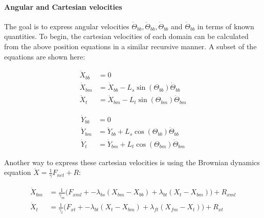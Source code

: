 \documentclass[10pt]{article} %
\begin{document}
\paragraph{Angular and Cartesian velocities}
The goal is to express angular velocities $\dot{\Theta}_{bb}, \dot{\Theta}_{bb}, \dot{\Theta}_{bb}$ and $\dot{\Theta}_{bb}$ in terms of known quantities. To begin, the cartesian velocities of each domain can be calculated from the above position equations in a similar recursive manner. A subset of the equations are shown here:

\noindent\begin{minipage}{0.49\linewidth}
\begin{align}
  \dot{X}_{bb} &= 0 \\
  \dot{X}_{bm} &= \dot{X}_{bb} - L_{s}\sin(\Theta_{bb})\dot{\Theta}_{bb} \label{cartesian-bmx}\\
  \dot{X}_{t } &= \dot{X}_{bm} - L_{t}\sin(\Theta_{bm})\dot{\Theta}_{bm}
\end{align}
\end{minipage}
\begin{minipage}{0.49\linewidth}
\begin{align}                                                                          
  \dot{Y}_{bb} &= 0 \\                                                        
  \dot{Y}_{bm} &= \dot{Y}_{bb} + L_{s}\cos(\Theta_{bb})\dot{\Theta}_{bb} \\
  \dot{Y}_{t}  &= \dot{Y}_{bm} + L_{t}\cos(\Theta_{bm})\dot{\Theta}_{bm}
\end{align}
\end{minipage}
\vspace{.5cm}

Another way to express these cartesian velocities is using the Brownian dynamics equation $\dot{X} = \frac1\gamma F_{net} + R$:

\begin{align}  
  \dot{X}_{bm} &= \frac{1}{\gamma_m} \Big(F_{xml} + - \lambda_{bs}(X_{bm} - X_{bb}) + \lambda_{bt}(X_{t } - X_{bm}) \Big) + R_{xml} \label{brownian-bmx}\\
  \dot{X}_{t } &= \frac{1}{\gamma_t} \Big(F_{xt } + - \lambda_{bt}(X_{t } - X_{bm}) + \lambda_{ft}(X_{fm} - X_{t }) \Big) + R_{xt }
\end{align}
\end{document}
